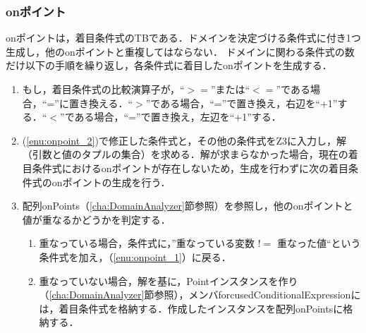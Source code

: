 \documentclass[uplatex, report, a4j, 10pt]{jsbook}
\begin{document}
\subsubsection{onポイント}
onポイントは，着目条件式のTBである．ドメインを決定づける条件式に付き1つ生成し，他のonポイントと重複してはならない．
ドメインに関わる条件式の数だけ以下の手順を繰り返し，各条件式に着目したonポイントを生成する．
\begin{enumerate}
	\item\label{enu:onpoint_2} もし，着目条件式の比較演算子が，“$>=$”または“$<=$”である場合，“=”に置き換える．“$>$”である場合，“=”で置き換え，右辺を“+1”する．“$<$”である場合，“=”で置き換え，左辺を“+1”する．
	\item\label{enu:onpoint_1} (\ref{enu:onpoint_2})で修正した条件式と，その他の条件式をZ3に入力し，解（引数と値のタプルの集合）を求める．解が求まらなかった場合，現在の着目条件式におけるonポイントが存在しないため，生成を行わずに次の着目条件式のonポイントの生成を行う．
	\item 配列onPoints（\ref{cha:DomainAnalyzer}節参照）を参照し，他のonポイントと値が重なるかどうかを判定する．
	      \begin{enumerate}
	      	\item 重なっている場合，条件式に，”重なっている変数 $!=$ 重なった値“という条件式を加え，（\ref{enu:onpoint_1}）に戻る．
	      	\item 重なっていない場合，解を基に，Pointインスタンスを作り（\ref{cha:DomainAnalyzer}節参照），メンバforcusedConditionalExpressionには，着目条件式を格納する．作成したインスタンスを配列onPointsに格納する．
	      \end{enumerate}
\end{enumerate}
\end{document}
